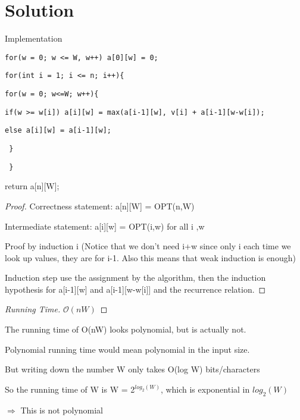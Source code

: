 \documentclass[openany]{article}
\begin{document}
\section*{Solution}
\begin{solution*}{}
    Implementation
    
    \qquad \texttt{for(w = 0; w <= W, w++) a[0][w] = 0;}
    
    \qquad \texttt{for(int i = 1; i <= n; i++)\{ }
    
    \qquad    \qquad \texttt{for(w = 0; w<=W; w++)\{ }
    
      \qquad \qquad  \qquad  \texttt{if(w >= w[i]) a[i][w] = max(a[i-1][w], v[i] + a[i-1][w-w[i]);}
      
       \qquad \qquad    \qquad \texttt{else a[i][w] = a[i-1][w];}
       
       \qquad \qquad \texttt{ \} }
       
   \qquad \texttt{ \} }
    
    return a[n][W];
    
    \begin{proof}{}
        Correctness statement: a[n][W] = OPT(n,W)
        
        Intermediate statement: a[i][w] = OPT(i,w) for all i ,w
        
        Proof by induction i (Notice that we don't need i+w since only i each time we look up values, they are for i-1. Also this means that weak induction is enough)
        
        Induction step use the assignment by the algorithm, then the induction hypothesis for a[i-1][w] and a[i-1][w-w[i]] and the recurrence relation.
    \end{proof}
    
    \begin{proof}[Running Time]{}
        \renewcommand{\qedsymbol}{}
        $\mathcal{O}(nW)$
        
    \end{proof}
            The running time of O(nW) looks polynomial, but is actually not.
        
        Polynomial running time would mean polynomial in the input size.
        
        But writing down the number W only takes O(log W) bits/characters
        
        So the running time of W is W = 2$^{log_2(W)}$, which is exponential in $log_2(W)$
        
        $\Rightarrow$ This is not polynomial
        

\end{solution*}
\end{document}
